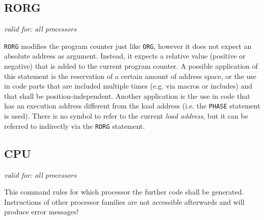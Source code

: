 \documentclass[12pt,twoside]{report}
\makeatletter
\newcommand{\tty}[1]{{\tt #1}}
\newcommand{\ttindex}[1]{\index{#1@{\tt #1}}}
\makeatother
\begin{document}

\subsection{RORG}
\label{SectRORG}
\ttindex{RORG}

{\em valid for: all processors}

\tty{RORG} modifies the program counter just like \tty{ORG},
however it does not expect an absolute address as argument.
Instead, it expects a relative value (positive or negative) that
is added to the current program counter.  A possible application
of this statement is the reservation of a certain amount of
address space, or the use in code parts that are included
multiple times (e.g. via macros or includes) and that shall be
position-independent.  Another application is the use in code
that has an execution address different from the load address
(i.e. the \tty{PHASE} statement is used).  There is no symbol to
refer to the current {\em load address}, but it can be referred
to indirectly via the \tty{RORG} statement.


\subsection{CPU}
\label{SectCPU}
\ttindex{CPU}

{\em valid for: all processors}

This command rules for which processor the further code shall be
generated.  Instructions of other processor families are not
accessible afterwards and will produce error messages!
\end{document}
